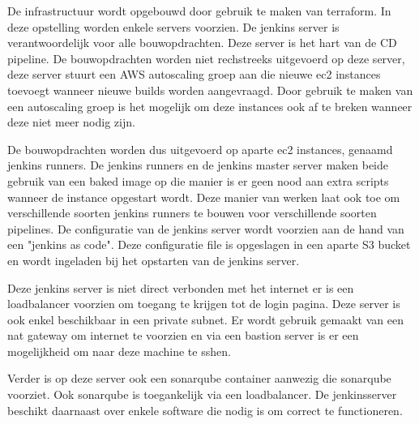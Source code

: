 
De infrastructuur wordt opgebouwd door gebruik te maken van terraform. In deze opstelling worden enkele servers voorzien. De jenkins server is verantwoordelijk voor alle bouwopdrachten. Deze server is het hart van de CD pipeline. De bouwopdrachten worden niet rechstreeks uitgevoerd op deze server, deze server stuurt een AWS autoscaling groep aan die nieuwe ec2 instances toevoegt wanneer nieuwe builds worden aangevraagd. Door gebruik te maken van een autoscaling groep is het mogelijk om deze instances ook af te breken wanneer deze niet meer nodig zijn. 
\newline

De bouwopdrachten worden dus uitgevoerd op aparte ec2 instances, genaamd jenkins runners. De jenkins runners en de jenkins master server maken beide gebruik van een baked image op die manier is er geen nood aan extra scripts wanneer de instance  opgestart wordt. Deze manier van werken laat ook toe om verschillende soorten jenkins runners te bouwen voor verschillende soorten pipelines. De configuratie van de jenkins server wordt voorzien aan de hand van een "jenkins as code". Deze configuratie file is opgeslagen in een aparte S3 bucket en wordt ingeladen bij het opstarten van de jenkins server.
\newline

Deze jenkins server is niet direct verbonden met het internet er is een loadbalancer voorzien om toegang te krijgen tot de login pagina. Deze server is ook enkel beschikbaar in een private subnet. Er wordt gebruik gemaakt van een nat gateway om internet te voorzien en via een bastion server is er een mogelijkheid om naar deze machine te sshen.
\newline

Verder is op deze server ook een sonarqube container aanwezig die sonarqube voorziet. Ook sonarqube is toegankelijk via een loadbalancer. De jenkinsserver beschikt daarnaast over enkele software die nodig is om correct te functioneren.
\newline



